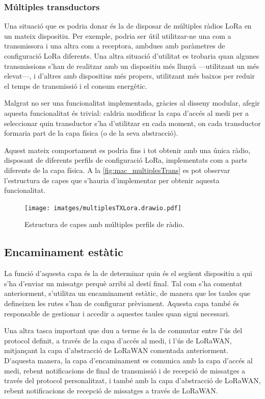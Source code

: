 \documentclass{tfgitic}[2024/07/01]
\begin{document}
{\subsubsection{Múltiples transductors}
Una situació que es podria donar és la de disposar de múltiples ràdios LoRa en un mateix dispositiu. Per exemple, podria ser útil utilitzar-ne una com a transmissora i una altra com a receptora, ambdues amb paràmetres de configuració LoRa diferents. Una altra situació d'utilitat es trobaria quan algunes transmissions s'han de realitzar amb un dispositiu més llunyà ---utilitzant un  més elevat---, i d'altres amb dispositius més propers, utilitzant  més baixos per reduir el temps de transmissió i el consum energètic.

Malgrat no ser una funcionalitat implementada, gràcies al disseny modular, afegir aquesta funcionalitat és trivial: caldria modificar la capa d'accés al medi per a seleccionar quin transductor s'ha d'utilitzar en cada moment, on cada transductor formaria part de la capa física (o de la seva abstracció).

Aquest mateix comportament es podria fins i tot obtenir amb una única ràdio, disposant de diferents perfils de configuració LoRa, implementats com a parts diferents de la capa física. A la \autoref{fig:mac_multiplesTrans} es pot observar l'estructura de capes que s'hauria d'implementar per obtenir aquesta funcionalitat.

\begin{figure}
    \centering
        \texttt{[image: imatges/multiplesTXLora.drawio.pdf]}
    \caption{Estructura de capes amb múltiples perfils de ràdio.}
    \label{fig:mac_multiplesTrans}
\end{figure}

\subsection{Encaminament estàtic}
La funció d'aquesta capa és la de determinar quin és el següent dispositiu a qui s'ha d'enviar un missatge perquè arribi al destí final. Tal com s'ha comentat anteriorment, s'utilitza un encaminament estàtic, de manera que les taules que defineixen les rutes s'han de configurar prèviament. Aquesta capa també és responsable de gestionar i accedir a aquestes taules quan sigui necessari.

Una altra tasca important que duu a terme és la de commutar entre l'ús del protocol definit, a través de la capa d'accés al medi, i l'ús de LoRaWAN, mitjançant la capa d'abstracció de LoRaWAN comentada anteriorment. D'aquesta manera, la capa d'encaminament es comunica amb la capa d'accés al medi, rebent notificacions de final de transmissió i de recepció de missatges a través del protocol personalitzat, i també amb la capa d'abstracció de LoRaWAN, rebent notificacions de recepció de missatges a través de LoRaWAN.

}
\end{document}
